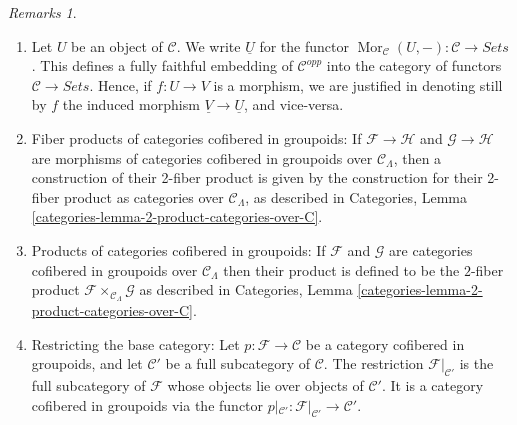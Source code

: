 \documentclass{stacks-project}
\theoremstyle{plain}
\theoremstyle{definition}
\theoremstyle{remark}
\newtheorem{remarks}[subsection]{Remarks}
\numberwithin{equation}{subsection}
\def\Mor{\mathop{\mathrm{Mor}}\nolimits}
\begin{document}
\begin{remarks}
\begin{enumerate}
Hence if $F : \mathcal{C} \to \textit{Sets}$ is a functor, we denote the
associated category cofibered in sets also by $F$; and if
$\varphi : F \to G$ is a morphism of functors, we denote still by $\varphi$
the corresponding morphism of categories cofibered in sets, and vice-versa.
See Categories, Section \ref{categories-section-fibred-in-sets}.
\item
\label{item-definition-yoneda}
Let $U$ be an object of $\mathcal{C}$.  We write $\underline{U}$ for the
functor
$\Mor_\mathcal{C}(U, -): \mathcal{C} \to
\textit{Sets}$.  This defines a fully faithful embedding of $\mathcal
C^{opp}$ into the category of functors $\mathcal{C} \to
\textit{Sets}$. Hence, if $f : U \to V$ is a morphism, we are
justified in denoting still by $f$ the induced morphism $\underline{V}
\to \underline{U}$, and vice-versa.
\item
\label{item-fibre-product}
Fiber products of categories cofibered in groupoids: If $\mathcal{F}
\to \mathcal{H}$ and $\mathcal{G} \to \mathcal{H}$ are morphisms
of categories cofibered in groupoids over $\mathcal{C}_\Lambda$, then a
construction of their 2-fiber product is given by the construction for their
2-fiber product as categories over $\mathcal{C}_\Lambda$, as described in
Categories, Lemma \ref{categories-lemma-2-product-categories-over-C}.
\item
\label{item-product}
Products of categories cofibered in groupoids: If $\mathcal{F}$ and
$\mathcal{G}$ are categories cofibered in groupoids over
$\mathcal{C}_\Lambda$ then their product is defined to be the $2$-fiber product
$\mathcal{F} \times_{\mathcal{C}_\Lambda} \mathcal{G}$ as described in
Categories, Lemma \ref{categories-lemma-2-product-categories-over-C}.
\item
\label{item-definition-restricting-base-category}
Restricting the base category: Let $p : \mathcal{F} \to \mathcal{C}$ be a
category cofibered in groupoids, and let $\mathcal{C}'$ be a full
subcategory of $\mathcal{C}$. The restriction $\mathcal{F}|_{\mathcal{C}'}$
is the full subcategory of $\mathcal{F}$ whose objects lie over
objects of $\mathcal{C}'$. It is a category cofibered in groupoids via
the functor
$p|_{\mathcal{C}'}: \mathcal{F}|_{\mathcal{C}'} \to \mathcal{C}'$.
\end{enumerate}
\end{remarks}
\end{document}
